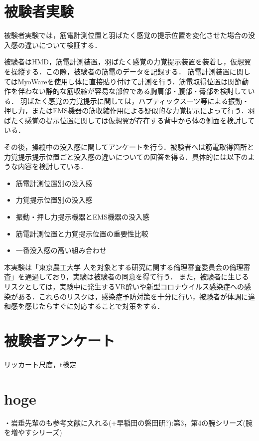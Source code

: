         \section{被験者実験}
        
        被験者実験では，筋電計測位置と羽ばたく感覚の提示位置を変化させた場合の没入感の違いについて検証する．
        
        被験者はHMD，筋電計測装置，羽ばたく感覚の力覚提示装置を装着し，仮想翼を操縦する．この際，被験者の筋電のデータを記録する．
        筋電計測装置に関してはMyoWareを使用し体に直接貼り付けて計測を行う．筋電取得位置は関節動作を伴わない静的な筋収縮が容易な部位である胸肩部・腹部・臀部を検討している．
        羽ばたく感覚の力覚提示に関しては，ハプティックスーツ等による振動・押し力，またはEMS機器の筋収縮作用による疑似的な力覚提示によって行う．羽ばたく感覚の提示位置に関しては仮想翼が存在する背中から体の側面を検討している．
        
        その後，操縦中の没入感に関してアンケートを行う．被験者へは筋電取得箇所と力覚提示提示位置ごと没入感の違いについての回答を得る．具体的には以下のような内容を検討している．
        \begin{itemize}
        \item 筋電計測位置別の没入感
        \item 力覚提示位置別の没入感
        \item 振動・押し力提示機器とEMS機器の没入感
        \item 筋電計測位置と力覚提示位置の重要性比較
        \item 一番没入感の高い組み合わせ
        \end{itemize}
    
        
        本実験は「東京農工大学 人を対象とする研究に関する倫理審査委員会の倫理審査」を通過しており，実験は被験者の同意を得て行う．
        また，被験者に生じるリスクとしては，実験中に発生するVR酔いや新型コロナウイルス感染症への感染がある．これらのリスクは，感染症予防対策を十分に行い，被験者が体調に違和感を感じたらすぐに対応することで対策をする．
        
        
    \section{被験者アンケート}
    リッカート尺度，t検定
    
    

\section{hoge}        
        ・岩垂先輩のも参考文献に入れる(+早稲田の磐田研?):第3，第4の腕シリーズ(腕を増やすシリーズ) 

